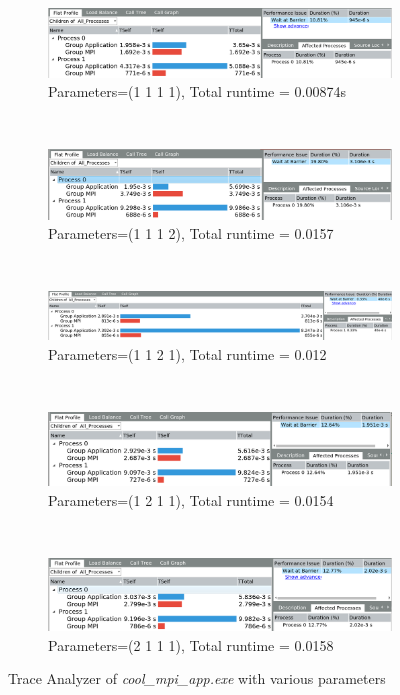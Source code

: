 \documentclass[article]{scrartcl}
\begin{document}
\begin{figure}[htpb]
	\centering
	\begin{subfigure}{0.9\textwidth}
		\includegraphics[width=\textwidth,keepaspectratio=true]{../figs/4_2_para_1_1_1_1.png}
		\caption{Parameters=(1 1 1 1), Total runtime = 0.00874s}
		\label{fig:trace1}
	\end{subfigure}
~ 
	\begin{subfigure}{0.9\textwidth}
	\centering
	\includegraphics[width=\textwidth,keepaspectratio=true]{../figs/4_2_para_1_1_1_2.png}
	\caption{Parameters=(1 1 1 2), Total runtime = 0.0157}
	\label{fig:trace2}
	\end{subfigure}
~
	\begin{subfigure}{0.9\textwidth}
	\centering
	\includegraphics[width=\textwidth,keepaspectratio=true]{../figs/4_2_para_1_1_2_1.png}
	\caption{Parameters=(1 1 2 1), Total runtime = 0.012}
	\label{fig:trace3}
	\end{subfigure}
~
	\begin{subfigure}{0.9\textwidth}
	\centering
	\includegraphics[width=\textwidth,keepaspectratio=true]{../figs/4_2_para_1_2_1_1.png}
	\caption{Parameters=(1 2 1 1), Total runtime = 0.0154}
	\label{fig:trace4}
	\end{subfigure}
~
	\begin{subfigure}{0.9\textwidth}
	\centering
	\includegraphics[width=\textwidth,keepaspectratio=true]{../figs/4_2_para_2_1_1_1.png}
	\caption{Parameters=(2 1 1 1), Total runtime = 0.0158}
	\label{fig:trace5}
	\end{subfigure}
	\caption{Trace Analyzer of \textit{cool\_mpi\_app.exe} with various parameters}
	\label{figs:trace_4.2}
\end{figure}
\end{document}
